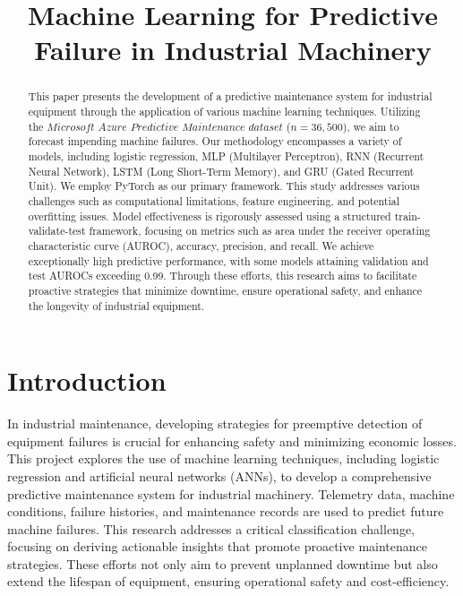 \documentclass{article}
\title{Machine Learning for Predictive Failure in Industrial Machinery}
\begin{document}
\maketitle

\begin{abstract}
    This paper presents the development of a predictive maintenance system for industrial equipment through the application of various machine learning techniques. Utilizing the $\textit{Microsoft Azure Predictive Maintenance dataset}$ \cite{reference1} ($n = 36,500$), we aim to forecast impending machine failures. Our methodology encompasses a variety of models, including logistic regression, MLP (Multilayer Perceptron), RNN (Recurrent Neural Network), LSTM (Long Short-Term Memory), and GRU (Gated Recurrent Unit). We employ PyTorch as our primary framework. This study addresses various challenges such as computational limitations, feature engineering, and potential overfitting issues. Model effectiveness is rigorously assessed using a structured train-validate-test framework, focusing on metrics such as area under the receiver operating characteristic curve (AUROC), accuracy, precision, and recall. We achieve exceptionally high predictive performance, with some models attaining validation and test AUROCs exceeding 0.99. Through these efforts, this research aims to facilitate proactive strategies that minimize downtime, ensure operational safety, and enhance the longevity of industrial equipment.
\end{abstract}

\section{Introduction}
\label{introduction}

In industrial maintenance, developing strategies for preemptive detection of equipment failures is crucial for enhancing safety and minimizing economic losses. This project explores the use of machine learning techniques, including logistic regression and artificial neural networks (ANNs), to develop a comprehensive predictive maintenance system for industrial machinery. Telemetry data, machine conditions, failure histories, and maintenance records are used to predict future machine failures. This research addresses a critical classification challenge, focusing on deriving actionable insights that promote proactive maintenance strategies. These efforts not only aim to prevent unplanned downtime but also extend the lifespan of equipment, ensuring operational safety and cost-efficiency.
\end{document}
